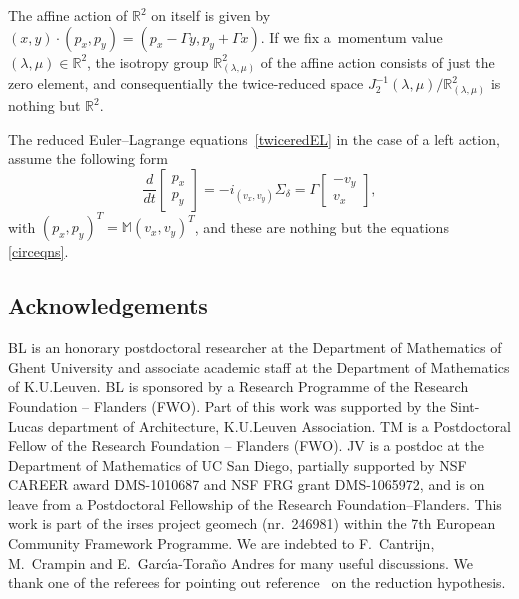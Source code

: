 \documentclass[pdftex]{sigma}
\begin{document}
The af\/f\/ine action of $\mathbb{R}^2$ on itself is given by $(x, y) \cdot (p_x, p_y) = (p_x - \Gamma y, p_y + \Gamma x)$.  If we f\/ix a~momentum value $(\lambda, \mu) \in \mathbb{R}^2$, the isotropy group $\mathbb{R}^2_{(\lambda, \mu)}$ of the af\/f\/ine action consists of just the zero element, and consequentially the twice-reduced space $J_2^{-1}(\lambda, \mu)/\mathbb{R}^2_{(\lambda, \mu)}$ is nothing but $\mathbb{R}^2$.

The reduced Euler--Lagrange equations~\eqref{twiceredEL} in the case of a left action, assume the following form
\[
	\frac{d}{dt} \begin{bmatrix} p_x \\ p_y \end{bmatrix}
	= - i_{(v_x,v_y)}\Sigma_\delta= \Gamma \begin{bmatrix} -v_y \\ v_x \end{bmatrix},
\]
with $(p_x, p_y)^T = \mathbb{M}(v_x,v_y)^T$, and these are nothing but the equations \eqref{circeqns}.


\subsection*{Acknowledgements}

BL is an honorary postdoctoral researcher at the Department of Mathematics of Ghent University and associate
academic staf\/f at the Department of Mathematics of K.U.Leuven. BL is sponsored by a Research Programme of the Research Foundation -- Flanders (FWO). Part of this work was supported by the Sint-Lucas department of Architecture, K.U.Leuven Association. TM is a  Postdoctoral Fellow of the Research Foundation -- Flanders (FWO).
JV is a postdoc at the Department of Mathematics of UC San Diego, partially supported by NSF CAREER award DMS-1010687 and NSF FRG grant DMS-1065972, and is on leave from a Postdoctoral Fellowship of the Research Foundation--Flanders.
This work is part of the {\sc irses} project {\sc
geomech} (nr.\ 246981) within the 7th European Community Framework Programme.
We are indebted to F.~Cantrijn, M.~Crampin and E.~Garc\'\i a-Tora\~no Andres for many useful discussions. We thank one of the referees for pointing out reference~\cite{mikityuk} on the reduction hypothesis.
\end{document}
